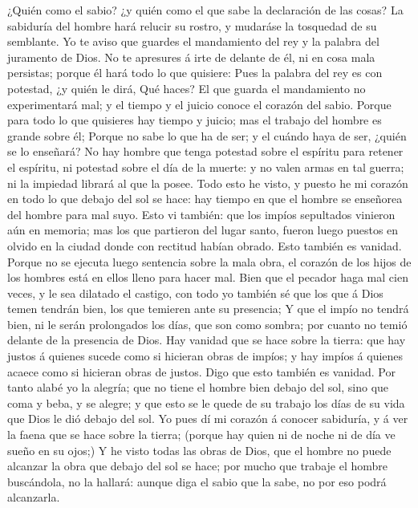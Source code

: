  ¿Quién como el sabio? ¿y quién como el que sabe la
declaración de las cosas? La sabiduría del hombre hará relucir su
rostro, y mudaráse la tosquedad de su semblante.  Yo te
aviso que guardes el mandamiento del rey y la palabra del juramento de
Dios.  No te apresures á irte de delante de él, ni en cosa
mala persistas; porque él hará todo lo que quisiere:  Pues
la palabra del rey es con potestad, ¿y quién le dirá, Qué haces?
 El que guarda el mandamiento no experimentará mal; y el
tiempo y el juicio conoce el corazón del sabio.  Porque
para todo lo que quisieres hay tiempo y juicio; mas el trabajo del
hombre es grande sobre él;  Porque no sabe lo que ha de
ser; y el cuándo haya de ser, ¿quién se lo enseñará?  No
hay hombre que tenga potestad sobre el espíritu para retener el
espíritu, ni potestad sobre el día de la muerte: y no valen armas en tal
guerra; ni la impiedad librará al que la posee.  Todo esto
he visto, y puesto he mi corazón en todo lo que debajo del sol se hace:
hay tiempo en que el hombre se enseñorea del hombre para mal suyo.
 Esto vi también: que los impíos sepultados vinieron aún
en memoria; mas los que partieron del lugar santo, fueron luego puestos
en olvido en la ciudad donde con rectitud habían obrado. Esto también es
vanidad.  Porque no se ejecuta luego sentencia sobre la
mala obra, el corazón de los hijos de los hombres está en ellos lleno
para hacer mal.  Bien que el pecador haga mal cien veces,
y le sea dilatado el castigo, con todo yo también sé que los que á Dios
temen tendrán bien, los que temieren ante su presencia; 
Y que el impío no tendrá bien, ni le serán prolongados los días, que son
como sombra; por cuanto no temió delante de la presencia de Dios.
 Hay vanidad que se hace sobre la tierra: que hay justos
á quienes sucede como si hicieran obras de impíos; y hay impíos á
quienes acaece como si hicieran obras de justos. Digo que esto también
es vanidad.  Por tanto alabé yo la alegría; que no tiene
el hombre bien debajo del sol, sino que coma y beba, y se alegre; y que
esto se le quede de su trabajo los días de su vida que Dios le dió
debajo del sol.  Yo pues dí mi corazón á conocer
sabiduría, y á ver la faena que se hace sobre la tierra; (porque hay
quien ni de noche ni de día ve sueño en su ojos;)  Y he
visto todas las obras de Dios, que el hombre no puede alcanzar la obra
que debajo del sol se hace; por mucho que trabaje el hombre buscándola,
no la hallará: aunque diga el sabio que la sabe, no por eso podrá
alcanzarla.

